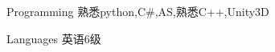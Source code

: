 


\begin{cvskills}


\cvskill
{Programming} %
{熟悉python,C\#,AS,熟悉C++,Unity3D} %




\cvskill
{Languages} %
{英语6级} %


\end{cvskills}